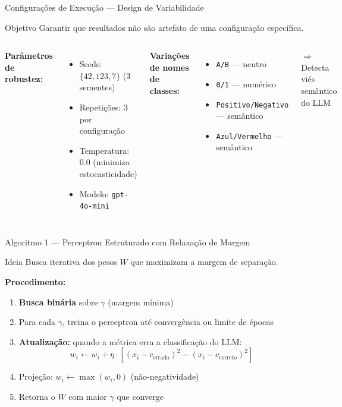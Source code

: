 \documentclass[aspectratio=169,12pt]{beamer}
\begin{document}
\begin{frame}{Configurações de Execução --- Design de Variabilidade}
\small
\begin{block}{Objetivo}
Garantir que resultados não são artefato de uma configuração específica.
\end{block}

\begin{columns}
\textbf{Parâmetros de robustez:}
\begin{itemize}
    \item Seeds: $\{42, 123, 7\}$ (3 sementes)
    \item Repetições: 3 por configuração
    \item Temperatura: $0.0$ (minimiza estocasticidade)
    \item Modelo: \texttt{gpt-4o-mini}
\end{itemize}

\textbf{Variações de nomes de classes:}
\begin{itemize}
    \item \texttt{A/B} --- neutro
    \item \texttt{0/1} --- numérico
    \item \texttt{Positivo/Negativo} --- semântico
    \item \texttt{Azul/Vermelho} --- semântico
\end{itemize}
\vspace{0.2cm}
$\Rightarrow$ Detecta viés semântico do LLM
\end{columns}
\end{frame}

\begin{frame}{Algoritmo 1 --- Perceptron Estruturado com Relaxação de Margem}
\small
\begin{block}{Ideia}
Busca iterativa dos pesos $W$ que maximizam a margem de separação.
\end{block}

\textbf{Procedimento:}
\begin{enumerate}
    \item \textbf{Busca binária} sobre $\gamma$ (margem mínima)
    \item Para cada $\gamma$, treina o perceptron até convergência ou limite de épocas
    \item \textbf{Atualização:} quando a métrica erra a classificação do LLM:
    \[
    w_i \leftarrow w_i + \eta \cdot \left[ (x_i - c_{\text{errado}})^2 - (x_i - c_{\text{correto}})^2 \right]
    \]
    \item Projeção: $w_i \leftarrow \max(w_i, 0)$ (não-negatividade)
    \item Retorna o $W$ com maior $\gamma$ que converge
\end{enumerate}
\end{frame}
\end{document}
